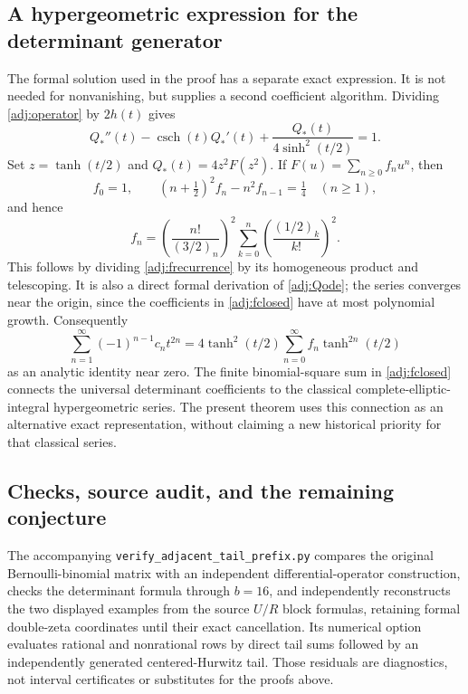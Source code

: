 \documentclass[11pt,a4paper]{article}
\numberwithin{equation}{section}
\theoremstyle{definition}
\theoremstyle{remark}
\begin{document}
\subsection{A hypergeometric expression for the determinant generator}

The formal solution used in the proof has a separate exact expression.
It is not needed for nonvanishing, but supplies a second coefficient
algorithm.  Dividing \eqref{adj:operator} by $2h(t)$ gives
\begin{equation}\label{adj:Qode}
 Q_*''(t)-\operatorname{csch}(t)Q_*'(t)
 +\frac{Q_*(t)}{4\sinh^2(t/2)}=1.
\end{equation}
Set $z=\tanh(t/2)$ and $Q_*(t)=4z^2F(z^2)$.  If
$F(u)=\sum_{n\ge0}f_nu^n$, then
\begin{equation}\label{adj:frecurrence}
 f_0=1,\qquad (n+\tfrac12)^2f_n-n^2f_{n-1}=\tfrac14
 \quad(n\ge1),
\end{equation}
and hence
\begin{equation}\label{adj:fclosed}
 f_n=\left(\frac{n!}{(3/2)_n}\right)^2
 \sum_{k=0}^{n}\left(\frac{(1/2)_k}{k!}\right)^2.
\end{equation}
This follows by dividing \eqref{adj:frecurrence} by its homogeneous
product and telescoping.  It is also a direct formal derivation of
\eqref{adj:Qode}; the series converges near the origin, since the
coefficients in \eqref{adj:fclosed} have at most polynomial growth.
Consequently
\begin{equation}\label{adj:detgenerator}
 \sum_{n=1}^{\infty}(-1)^{n-1}c_nt^{2n}
 =4\tanh^2(t/2)
 \sum_{n=0}^{\infty}f_n\tanh^{2n}(t/2)
\end{equation}
as an analytic identity near zero.  The finite binomial-square sum
in \eqref{adj:fclosed} connects the universal determinant
coefficients to the classical complete-elliptic-integral
hypergeometric series.  The present theorem uses this connection as
an alternative exact representation, without claiming a new
historical priority for that classical series.

\subsection{Checks, source audit, and the remaining conjecture}

The accompanying \texttt{verify\_adjacent\_tail\_prefix.py} compares
the original Bernoulli-binomial matrix with an independent
differential-operator construction, checks the determinant formula
through $b=16$, and independently reconstructs the two displayed
examples from the source $U/R$ block formulas, retaining formal
double-zeta coordinates until their exact cancellation.  Its
numerical option evaluates rational and nonrational rows by direct
tail sums followed by an independently generated centered-Hurwitz
tail.  Those residuals are diagnostics, not interval certificates
or substitutes for the proofs above.
\end{document}
